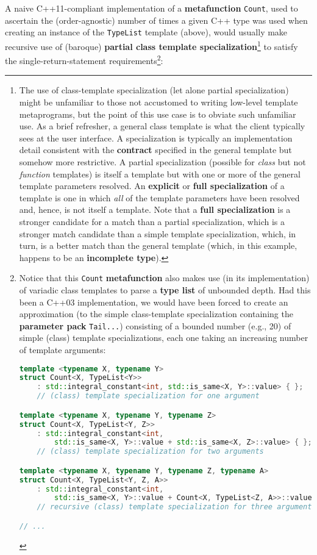 \noindent A naive C++11-compliant implementation of a \textbf{metafunction}
\texttt{Count}, used to ascertain the (order-agnostic) number of times a
given C++ type was used when creating an instance of the
\texttt{TypeList} template (above), would usually make recursive use of
(baroque) \textbf{partial class template
specialization}{\cprotect\footnote{The use of class-template
specialization (let alone partial specialization) might be unfamiliar
to those not accustomed to writing low-level template metaprograms, but the point of this use case is to obviate such
unfamiliar use. As a brief refresher, a general class template is what
the client typically sees at the user interface. A specialization is
typically an implementation detail consistent with the
\textbf{contract} specified in the general template but somehow more
restrictive. A partial specialization (possible for \emph{class} but
not \emph{function} templates) is itself a template but with one or
more of the general template parameters resolved. An \textbf{explicit}
or \textbf{full specialization} of a template is one in which
\emph{all} of the template parameters have been resolved and, hence, is
not itself a template. Note that a \textbf{full specialization} is a
stronger candidate for a match than a partial specialization, which is
a stronger match candidate than a simple template specialization,
which, in turn, is a better match than the general template (which, in
  this example, happens to be an \textbf{incomplete type}).}} to satisfy the single-return-statement requirements{\cprotect\footnote{Notice that this \texttt{Count}
\textbf{metafunction} also makes use (in its implementation) of
variadic class templates to parse a \textbf{type list} of unbounded
depth. Had this been a C++03 implementation, we would have been forced
to create an approximation (to the simple class-template
specialization containing the \textbf{parameter pack}
\texttt{Tail...}) consisting of a bounded number (e.g., 20) of simple
(class) template specializations, each one taking an increasing number
of template arguments:

\begin{lstlisting}[language=C++, basicstyle={\ttfamily\footnotesize}]
template <typename X, typename Y>
struct Count<X, TypeList<Y>>
    : std::integral_constant<int, std::is_same<X, Y>::value> { };
    // (class) template specialization for one argument

template <typename X, typename Y, typename Z>
struct Count<X, TypeList<Y, Z>>
    : std::integral_constant<int,
        std::is_same<X, Y>::value + std::is_same<X, Z>::value> { };
    // (class) template specialization for two arguments

template <typename X, typename Y, typename Z, typename A>
struct Count<X, TypeList<Y, Z, A>>
    : std::integral_constant<int,
        std::is_same<X, Y>::value + Count<X, TypeList<Z, A>>::value> { };
    // recursive (class) template specialization for three arguments

// ...
\end{lstlisting}
      }}:

